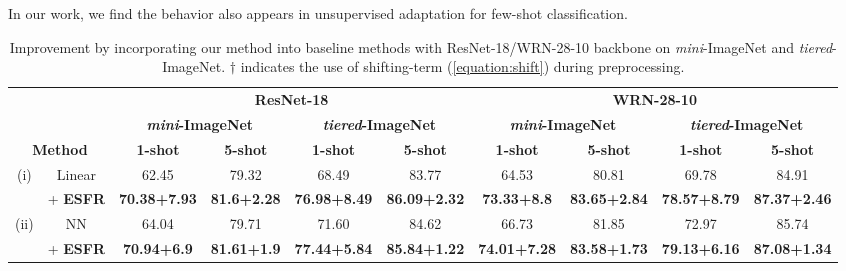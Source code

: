 \documentclass{article}
\begin{document}
In our work, we find the behavior also appears in unsupervised adaptation for few-shot classification.  \begin{table*}[t]
	\caption{Improvement by incorporating our method into baseline methods with ResNet-18/WRN-28-10 backbone on \textit{mini}-ImageNet and \textit{tiered}-ImageNet. $\dagger$ indicates the use of shifting-term (\ref{equation:shift}) during preprocessing.}
	\label{table:addition2}
	\begin{small}
		\begin{center}
			\begin{tabular}{cccccccccc}
				\hline
				& & \multicolumn{4}{c}{\textbf{ResNet-18}} & \multicolumn{4}{c}{\textbf{WRN-28-10}} \\
				& & \multicolumn{2}{c}{\textbf{\textit{mini}-ImageNet}} & \multicolumn{2}{c}{\textbf{\textit{tiered}-ImageNet}} & \multicolumn{2}{c}{\textbf{\textit{mini}-ImageNet}} & \multicolumn{2}{c}{\textbf{\textit{tiered}-ImageNet}} \\
				\multicolumn{2}{c}{\textbf{Method}} & \textbf{1-shot} & \textbf{5-shot} & \textbf{1-shot} & \textbf{5-shot}& \textbf{1-shot} & \textbf{5-shot}& \textbf{1-shot} & \textbf{5-shot} \\ \hline
				\multirow{2}{*}{(i)} & Linear & 62.45 & 79.32 & 68.49 & 83.77 & 64.53 & 80.81 & 69.78 & 84.91 \\
				&\cellcolor[HTML]{EFEFEF} + \textbf{ESFR} &\cellcolor[HTML]{EFEFEF} \textbf{70.38{\scriptsize+7.93}} &\cellcolor[HTML]{EFEFEF} \textbf{81.6{\scriptsize+2.28}} &\cellcolor[HTML]{EFEFEF} \textbf{76.98{\scriptsize+8.49}} &\cellcolor[HTML]{EFEFEF} \textbf{86.09{\scriptsize+2.32}} &\cellcolor[HTML]{EFEFEF} \textbf{73.33{\scriptsize+8.8}} &\cellcolor[HTML]{EFEFEF} \textbf{83.65{\scriptsize+2.84}} &\cellcolor[HTML]{EFEFEF} \textbf{78.57{\scriptsize+8.79}} &\cellcolor[HTML]{EFEFEF} \textbf{87.37{\scriptsize+2.46}} \\ \hline
				\multirow{2}{*}{(ii)} & NN & 64.04 & 79.71 & 71.60 & 84.62 & 66.73 & 81.85 & 72.97 & 85.74 \\
				&\cellcolor[HTML]{EFEFEF} + \textbf{ESFR} &\cellcolor[HTML]{EFEFEF} \textbf{70.94{\scriptsize+6.9}} &\cellcolor[HTML]{EFEFEF} \textbf{81.61{\scriptsize+1.9}} &\cellcolor[HTML]{EFEFEF} \textbf{77.44{\scriptsize+5.84}} &\cellcolor[HTML]{EFEFEF} \textbf{85.84{\scriptsize+1.22}} &\cellcolor[HTML]{EFEFEF} \textbf{74.01{\scriptsize+7.28}} &\cellcolor[HTML]{EFEFEF} \textbf{83.58{\scriptsize+1.73}} &\cellcolor[HTML]{EFEFEF} \textbf{79.13{\scriptsize+6.16}} &\cellcolor[HTML]{EFEFEF} \textbf{87.08{\scriptsize+1.34}} \\ \hline

\end{tabular}
\end{center}
\end{small}
\end{table*}
\end{document}
